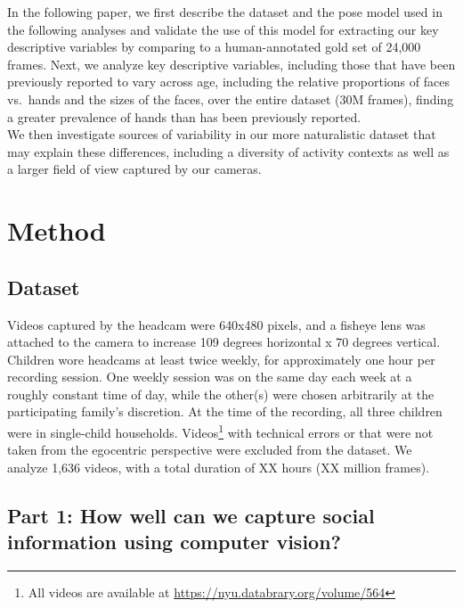 \documentclass[10pt, letterpaper]{article}
\begin{document}
In the following paper, we first describe the dataset and the pose model
used in the following analyses and validate the use of this model for
extracting our key descriptive variables by comparing to a
human-annotated gold set of 24,000 frames. Next, we analyze key
descriptive variables, including those that have been previously
reported to vary across age, including the relative proportions of faces
vs.~hands and the sizes of the faces, over the entire dataset (30M
frames), finding a greater prevalence of hands than has been previously
reported.\\
We then investigate sources of variability in our more naturalistic
dataset that may explain these differences, including a diversity of
activity contexts as well as a larger field of view captured by our
cameras.

\hypertarget{method}{%
\section{Method}\label{method}}

\hypertarget{dataset}{%
\subsection{Dataset}\label{dataset}}

Videos captured by the headcam were 640x480 pixels, and a fisheye lens
was attached to the camera to increase 109 degrees horizontal x 70
degrees vertical. Children wore headcams at least twice weekly, for
approximately one hour per recording session. One weekly session was on
the same day each week at a roughly constant time of day, while the
other(s) were chosen arbitrarily at the participating family's
discretion. At the time of the recording, all three children were in
single-child households. Videos\footnote{All videos are available at
  \url{https://nyu.databrary.org/volume/564}} with technical errors or
that were not taken from the egocentric perspective were excluded from
the dataset. We analyze 1,636 videos, with a total duration of XX hours
(XX million frames).

\hypertarget{part-1-how-well-can-we-capture-social-information-using-computer-vision}{%
\subsection{Part 1: How well can we capture social information using
computer
vision?}\label{part-1-how-well-can-we-capture-social-information-using-computer-vision}}
\end{document}
